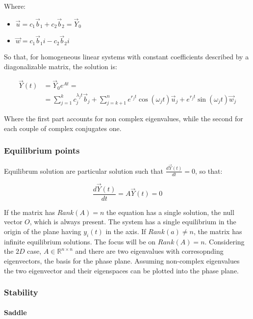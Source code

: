   Where:

  \begin{multicols}{2}
    \begin{itemize}
      \item $\vec{u} = c_1\vec{b}_1 + c_2\vec{b}_2 = \vec{Y}_0$
      \item $\vec{w} = c_1\vec{b}_1i - c_2\vec{b}_2i$
    \end{itemize}
  \end{multicols}

  So that, for homogeneous linear systems with constant coefficients described by a diagonalizable matrix, the solution is:

  \begin{align*}
    \vec{Y}(t) &= \vec{Y}_0 e^{At} = \\
               &=\sum\limits_{j=1}^k c_j^{\lambda_j t}\vec{b}_j + \sum\limits_{j=k+1}^n e^{r_jt}\cos(\omega_jt)\vec{u}_j + e^{r_jt}\sin(\omega_jt)\vec{w}_j
  \end{align*}

  Where the first part accounts for non complex eigenvalues, while the second for each couple of complex conjugates one.

    \subsubsection{Equilibrium points}
    Equilibrum solution are particular solution such that $\frac{d\vec{Y}(t)}{dt} = 0$, so that:

    $$\frac{d\vec{Y}(t)}{dt} = A\vec{Y}(t) = 0$$

    If the matrix has $Rank(A) = n$ the equation has a single solution, the null vector $O$, which is always present.
    The system has a single equilibrium in the origin of the plane having $y_i(t)$ in the axis.
    If $Rank(a) \neq n$, the matrix has infinite equilibrium solutions.
    The focus will be on $Rank(A) = n$.
    Considering the $2D$ case, $A\in\mathbb{R}^{n\times n}$ and there are two eigenvalues with corresopnding eigenvectors, the basis for the phase plane.
    Assuming non-complex eigenvalues the two eigenvector and their eigenspaces can be plotted into the phase plane.

    \subsubsection{Stability}

      \paragraph{Saddle}


